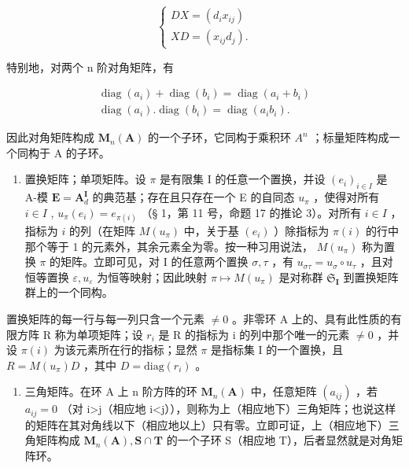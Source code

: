 \[
\left\{ \begin{array}{l} D X = (d _ {i} x _ {i j}) \\ X D = (x _ {i j} d _ {j}). \end{array} \right.\tag{30}
\]

特别地，对两个 n 阶对角矩阵，有

\[
\begin{array}{c} \operatorname{diag} (a _ {i}) + \operatorname{diag} (b _ {i}) = \operatorname{diag} (a _ {i} + b _ {i}) \\ \operatorname{diag} (a _ {i}). \operatorname{diag} (b _ {i}) = \operatorname{diag} (a _ {i} b _ {i}). \end{array}\tag{31}
\]

因此对角矩阵构成 \(\mathbf{M}_{n}(\mathbf{A})\) 的一个子环，它同构于乘积环 \(A^{n}\) ；标量矩阵构成一个同构于 A 的子环。

\begin{enumerate}
\def\labelenumi{\Roman{enumi}.}
\setcounter{enumi}{1}
\tightlist
\item
  置换矩阵；单项矩阵。设 \(\pi\) 是有限集 I 的任意一个置换，并设 \((e_i)_{i\in I}\) 是 A-模 \(\mathbf{E} = \mathbf{A}_d^{\mathbf{I}}\) 的典范基；存在且只存在一个 E 的自同态 \(u_{\pi}\) ，使得对所有 \(i\in I\) , \(u_{\pi}(e_i) = e_{\pi(i)}\) （§ 1，第 11 号，命题 17 的推论 3）。对所有 \(i\in I\) ，指标为 \(i\) 的列（在矩阵 \(M(u_{\pi})\) 中，关于基 \((e_i)\) ）除指标为 \(\pi(i)\) 的行中那个等于 1 的元素外，其余元素全为零。按一种习用说法， \(M(u_{\pi})\) 称为置换 \(\pi\) 的矩阵。立即可见，对 I 的任意两个置换 \(\sigma, \tau\) ，有 \(u_{\sigma \tau} = u_{\sigma} \circ u_{\tau}\) ，且对恒等置换 \(\varepsilon, u_{\varepsilon}\) 为恒等映射；因此映射 \(\pi \mapsto M(u_{\pi})\) 是对称群 \(\mathfrak{S}_{\mathbf{I}}\) 到置换矩阵群上的一个同构。
\end{enumerate}

置换矩阵的每一行与每一列只含一个元素 \(\neq0\) 。非零环 A 上的、具有此性质的有限方阵 R 称为单项矩阵；设 \(r_{i}\) 是 R 的指标为 i 的列中那个唯一的元素 \(\neq0\) ，并设 \(\pi(i)\) 为该元素所在行的指标；显然 \(\pi\) 是指标集 I 的一个置换，且 \(R=M(u_{\pi})D\) ，其中 \(D=\mathrm{diag}(r_{i})\) 。

\begin{enumerate}
\def\labelenumi{\Roman{enumi}.}
\setcounter{enumi}{2}
\tightlist
\item
  三角矩阵。在环 A 上 n 阶方阵的环 \(\mathbf{M}_{n}(\mathbf{A})\) 中，任意矩阵 \((a_{ij})\) ，若 \(a_{ij}=0\) （对 i\textgreater j（相应地 i\textless j）），则称为上（相应地下）三角矩阵；也说这样的矩阵在其对角线以下（相应地以上）只有零。立即可证，上（相应地下）三角矩阵构成 \(\mathbf{M}_{n}(\mathbf{A}),\mathbf{S}\cap\mathbf{T}\) 的一个子环 S（相应地 T），后者显然就是对角矩阵环。
\end{enumerate}

